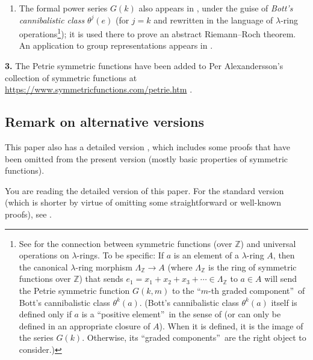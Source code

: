 \documentclass[numbers=enddot,12pt,final,onecolumn,notitlepage]{scrartcl}%
\theoremstyle{definition}
\newenvironment{verlong}{}{}
\newenvironment{vershort}{}{}
\begin{document}
\begin{enumerate}
\item[\textbf{(d)}] The formal power series $G\left(  k\right)  $ also appears
in \cite[Chapter I, \S 6]{FulLan85}, under the guise of \emph{Bott's
cannibalistic class} $\theta^{j}\left(  e\right)  $ (for $j=k$ and rewritten
in the language of $\lambda$-ring operations\footnote{See \cite[\S 16.74]%
{Hazewi08} for the connection between symmetric functions (over $\mathbb{Z}$)
and universal operations on $\lambda$-rings. To be specific: If $a$ is an
element of a $\lambda$-ring $A$, then the canonical $\lambda$-ring morphism
$\Lambda_{\mathbb{Z}}\rightarrow A$ (where $\Lambda_{\mathbb{Z}}$ is the ring
of symmetric functions over $\mathbb{Z}$) that sends $e_{1}=x_{1}+x_{2}%
+x_{3}+\cdots\in\Lambda_{\mathbb{Z}}$ to $a\in A$ will send the Petrie
symmetric function $G\left(  k,m\right)  $ to the \textquotedblleft$m$-th
graded component\textquotedblright\ of Bott's cannibalistic class $\theta
^{k}\left(  a\right)  $. (Bott's cannibalistic class $\theta^{k}\left(
a\right)  $ itself is defined only if $a$ is a \textquotedblleft positive
element\textquotedblright\ in the sense of \cite{FulLan85} (or can only be
defined in an appropriate closure of $A$). When it is defined, it is the image
of the series $G\left(  k\right)  $. Otherwise, its \textquotedblleft graded
components\textquotedblright\ are the right object to consider.)}); it is used
there to prove an abstract Riemann--Roch theorem. An application to group
representations appears in \cite{AtiTal69}.
\end{enumerate}

\textbf{3.} The Petrie symmetric functions have been added to Per
Alexandersson's collection of symmetric functions at
\url{https://www.symmetricfunctions.com/petrie.htm} .

\subsection*{Remark on alternative versions}

\begin{vershort}
This paper also has a detailed version \cite{verlong}, which includes some
proofs that have been omitted from the present version (mostly basic
properties of symmetric functions).
\end{vershort}

\begin{verlong}
You are reading the detailed version of this paper. For the standard version
(which is shorter by virtue of omitting some straightforward or well-known
proofs), see \cite{vershort}.
\end{verlong}
\end{document}
